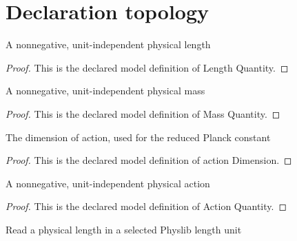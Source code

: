 \section{Declaration topology}
\begin{definition}
  \label{def:physics:phyx-mini-0532:phyxminiproblems-problemphyxmini0532-lengthquantity}
  A nonnegative, unit-independent physical length
\end{definition}
\begin{proof}
  This is the declared model definition of Length Quantity.
\end{proof}
\begin{definition}
  \label{def:physics:phyx-mini-0532:phyxminiproblems-problemphyxmini0532-massquantity}
  A nonnegative, unit-independent physical mass
\end{definition}
\begin{proof}
  This is the declared model definition of Mass Quantity.
\end{proof}
\begin{definition}
  \label{def:physics:phyx-mini-0532:phyxminiproblems-problemphyxmini0532-actiondimension}
  The dimension of action, used for the reduced Planck constant
\end{definition}
\begin{proof}
  This is the declared model definition of action Dimension.
\end{proof}
\begin{definition}
  \label{def:physics:phyx-mini-0532:phyxminiproblems-problemphyxmini0532-actionquantity}
  A nonnegative, unit-independent physical action
\end{definition}
\begin{proof}
  This is the declared model definition of Action Quantity.
\end{proof}
\begin{definition}
  \label{def:physics:phyx-mini-0532:phyxminiproblems-problemphyxmini0532-lengthreadout}
  Read a physical length in a selected Physlib length unit
\end{definition}
